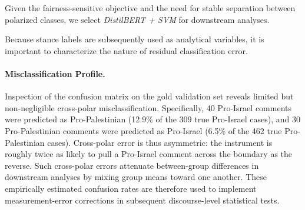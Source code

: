 \documentclass[letterpaper]{article} %
\begin{document}
Given the fairness-sensitive objective and the need for stable separation between polarized classes, we select \emph{DistilBERT + SVM} for downstream analyses.

\begin{table}[h!]
\centering
\caption{Classifier performance on the held-out human gold test set ($N=1{,}057$).}
\label{tab:final-results}
\end{table}

Because stance labels are subsequently used as analytical variables, it is important to characterize the nature of residual classification error.

\paragraph{Misclassification Profile.}
Inspection of the confusion matrix on the gold validation set reveals limited but non-negligible cross-polar misclassification. Specifically, 40 Pro-Israel comments were predicted as Pro-Palestinian (12.9\% of the 309 true Pro-Israel cases), and 30 Pro-Palestinian comments were predicted as Pro-Israel (6.5\% of the 462 true Pro-Palestinian cases). Cross-polar error is thus asymmetric: the instrument is roughly twice as likely to pull a Pro-Israel comment across the boundary as the reverse. Such cross-polar errors attenuate between-group differences in downstream analyses by mixing group means toward one another. These empirically estimated confusion rates are therefore used to implement measurement-error corrections in subsequent discourse-level statistical tests.
\end{document}
